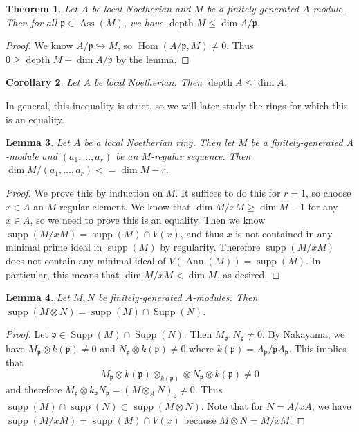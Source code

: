\documentclass[leqno, openany]{memoir}
\newtheorem{thm}{Theorem}[section]
\newtheorem{cor}[thm]{Corollary}
\newtheorem{lem}[thm]{Lemma}
\theoremstyle{definition}
\theoremstyle{remark}
\theoremstyle{plain}
\theoremstyle{definition}
\theoremstyle{remark}
\newcommand{\mf}[1]{\mathfrak{#1}}
\DeclareMathOperator{\Hom}{Hom}
\DeclareMathOperator{\supp}{supp}
\DeclareMathOperator{\Supp}{Supp}
\DeclareMathOperator{\Ann}{Ann}
\DeclareMathOperator{\Ass}{Ass}
\DeclareMathOperator{\dpth}{depth}
\begin{document}
\begin{thm}
    Let $A$ be local Noetherian and $M$ be a finitely-generated $A$-module. Then for all $\mf{p} \in \Ass(M)$, we have $\operatorname{depth} M \leq \dim A/\mf{p}$.
\end{thm}

\begin{proof}
    We know $A/\mf{p} \hookrightarrow M$, so $\Hom(A/\mf{p}, M) \neq 0$. Thus $0 \geq \operatorname{depth} M - \dim A/\mf{p}$ by the lemma.
\end{proof}

\begin{cor}
    Let $A$ be local Noetherian. Then $\dpth A \leq \dim A$.
\end{cor}

In general, this inequality is strict, so we will later study the rings for which this is an equality.

\begin{lem}
    Let $A$ be a local Noetherian ring. Then let $M$ be a finitely-generated $A$-module and $(a_1, \ldots, a_r)$ be an $M$-regular sequence. Then $\dim M/(a_1, \ldots, a_r)< = \dim M - r$.
\end{lem}

\begin{proof}
    We prove this by induction on $M$. It suffices to do this for $r = 1$, so choose $x \in A$ an $M$-regular element. We know that $\dim M/xM \geq \dim M - 1$ for any $x \in A$, so we need to prove this is an equality. Then we know $\supp(M/xM) = \supp(M) \cap V(x)$, and thus $x$ is not contained in any minimal prime ideal in $\supp(M)$ by regularity. Therefore $\supp(M/xM)$ does not contain any minimal ideal of $V(\Ann(M)) = \supp(M)$. In particular, this means that $\dim M/xM < \dim M$, as desired.
\end{proof}

\begin{lem}
    Let $M,N$ be finitely-generated $A$-modules. Then $\supp(M \otimes N) = \supp(M) \cap \Supp(N)$.
\end{lem}

\begin{proof}
    Let $\mf{p} \in \Supp(M) \cap \Supp(N)$. Then $M_{\mf{p}}, N_{\mf{p}} \neq 0$. By Nakayama, we have $M_{\mf{p}} \otimes k(\mf{p}) \neq 0$ and $N_{\mf{p}} \otimes k(\mf{p}) \neq 0$ where $k(\mf{p}) = A_{\mf{p}} / \mf{p} A_{\mf{p}}$. This implies that 
    \[ M_{\mf{p}} \otimes k(\mf{p}) \otimes_{k(\mf{p})} \otimes N_{\mf{p}} \otimes k(\mf{p}) \neq 0 \]
    and therefore $M_{\mf{p}} \otimes k_{\mf{p}} N_{\mf{p}} = (M \otimes_A N)_{\mf{p}} \neq 0$. Thus $\supp(M) \cap \supp(N) \subset \supp(M \otimes N)$. Note that for $N = A/xA$, we have $\supp(M/xM) = \supp(M) \cap V(x)$ because $M \otimes N = M/xM$.
\end{proof}
\end{document}
